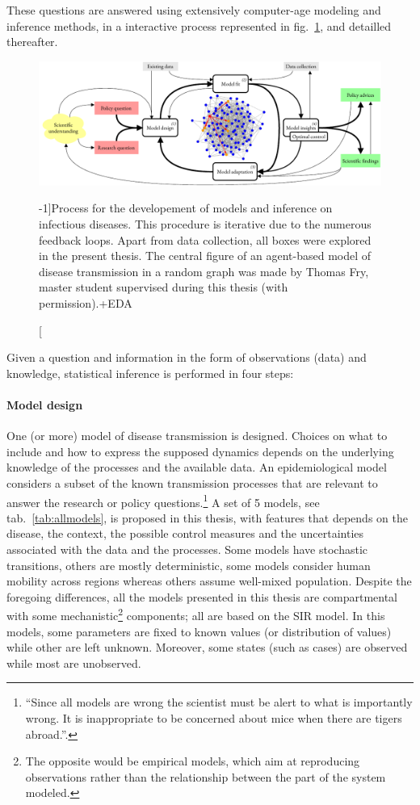 These questions are answered using extensively computer-age modeling and inference methods, in a interactive process represented in fig.~\ref{fig:modeling}, and detailled thereafter. %
 \begin{figure}\centering
  \includegraphics{fig/modeling_cycle}
  \caption[Process for infectious disease modeling][-1\baselineskip]{Process for the developement of models and inference on infectious diseases. This procedure is iterative due to the numerous feedback loops. Apart from data collection, all boxes were explored in the present thesis. The central figure of an agent-based model of disease transmission in a random graph was made by Thomas Fry,  master student supervised during this thesis (with permission).+EDA}\label{fig:modeling}
\end{figure}


Given a question and information in the form of observations (data) and knowledge, statistical inference is performed in four steps:

\paragraph{Model design} One (or more) model of disease transmission is designed. Choices on what to include and how to express the supposed dynamics depends on the underlying knowledge of the processes and the available data. An epidemiological model considers a subset of the known transmission processes that are relevant to answer the research or policy questions.\footnote[][5\baselineskip]{“Since all models are wrong the scientist must be alert to what is importantly wrong. It is inappropriate to be concerned about mice when there are tigers abroad.”.}  A set of 5 models, see tab.~\ref{tab:allmodels}, is proposed in this thesis, with features that depends on the disease, the context, the possible control measures and the uncertainties associated with the data and the processes. Some models have stochastic transitions, others are mostly deterministic, some models consider human mobility across regions whereas others assume well-mixed population. Despite the foregoing differences, all the models presented in this thesis are compartmental with some mechanistic\footnote{The opposite would be empirical models, which aim at reproducing observations rather than the relationship between the part of the system modeled.} components; all are based on the SIR model. In this models, some parameters are fixed to known values (or distribution of values) while other are left unknown. Moreover, some states (such as cases) are observed while most are unobserved.

